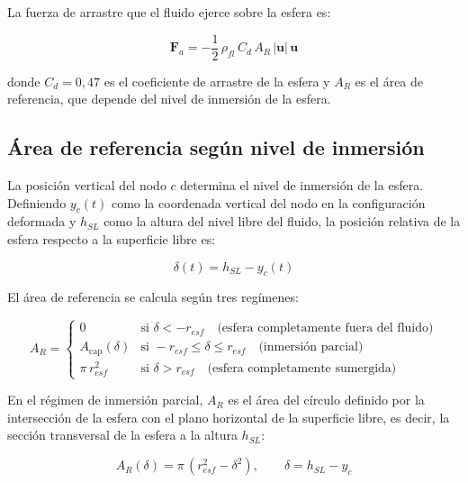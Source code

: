 \documentclass[12pt]{article}
\begin{document}
La fuerza de arrastre que el fluido ejerce sobre la esfera es:

\begin{equation}
    \mathbf{F}_a = -\frac{1}{2}\,\rho_{fl}\,C_d\,A_R\,|\mathbf{u}|\,\mathbf{u}
    \label{eq:drag}
\end{equation}

donde $C_d = 0{,}47$ es el coeficiente de arrastre de la esfera y $A_R$ es el área de referencia, que depende del nivel de inmersión de la esfera.

\subsection{Área de referencia según nivel de inmersión}

La posición vertical del nodo $c$ determina el nivel de inmersión de la esfera. Definiendo $y_c(t)$ como la coordenada vertical del nodo en la configuración deformada y $h_{SL}$ como la altura del nivel libre del fluido, la posición relativa de la esfera respecto a la superficie libre es:

\begin{equation}
    \delta(t) = h_{SL} - y_c(t)
    \label{eq:delta}
\end{equation}

El área de referencia se calcula según tres regímenes:

\begin{equation}
    A_R = \begin{cases}
        0 & \text{si } \delta < -r_{esf} \quad \text{(esfera completamente fuera del fluido)} \\
        A_{\text{cap}}(\delta) & \text{si } -r_{esf} \leq \delta \leq r_{esf} \quad \text{(inmersión parcial)} \\
        \pi\,r_{esf}^2 & \text{si } \delta > r_{esf} \quad \text{(esfera completamente sumergida)}
    \end{cases}
    \label{eq:AR}
\end{equation}

En el régimen de inmersión parcial, $A_R$ es el área del círculo definido por la intersección de la esfera con el plano horizontal de la superficie libre, es decir, la sección transversal de la esfera a la altura $h_{SL}$:

\begin{equation}
    A_R(\delta) = \pi\,(r_{esf}^2 - \delta^2), \qquad \delta = h_{SL} - y_c
    \label{eq:Acap}
\end{equation}
\end{document}
